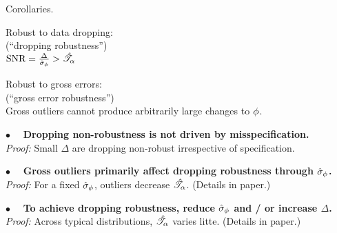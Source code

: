 
\begin{frame}[t]{Corollaries.}
%
\begin{minipage}[t]{0.45\textwidth}
\begin{center}
    Robust to data dropping:\\
    (``dropping robustness'')\\
    \vspace{1em}
    $\textrm{SNR} = \frac{\Delta}{\hat\sigma_{\phi}} > \hat{\mathscr{T}}_\alpha$
\end{center}
\end{minipage}
%
\begin{minipage}[t]{0.45\textwidth}
\begin{center}
    Robust to gross errors:\\
    (``gross error robustness'')\\
    \vspace{1em}
    Gross outliers cannot produce
    arbitrarily large changes to $\phi$.
\end{center}
\end{minipage}

\vspace{1em}
\hrulefill

\vspace{1em} $\bullet\quad$
\textbf{Dropping non-robustness is not driven by misspecification.\\}
\textit{Proof: }
Small $\Delta$ are dropping non-robust irrespective of specification.

\vspace{1em} $\bullet\quad$
\textbf{Gross outliers primarily affect dropping robustness through $\hat\sigma_{\phi}$.\\}
\textit{Proof: }
For a fixed $\hat\sigma_{\phi}$, outliers decrease $\hat{\mathscr{T}}_\alpha$.
(Details in paper.)

\vspace{1em} $\bullet\quad$
\textbf{To achieve dropping robustness,
reduce $\hat\sigma_{\phi}$ and / or increase $\Delta$.\\}
\textit{Proof: }
Across typical distributions, $\hat{\mathscr{T}}_\alpha$ varies litte.
(Details in paper.)

\end{frame}
